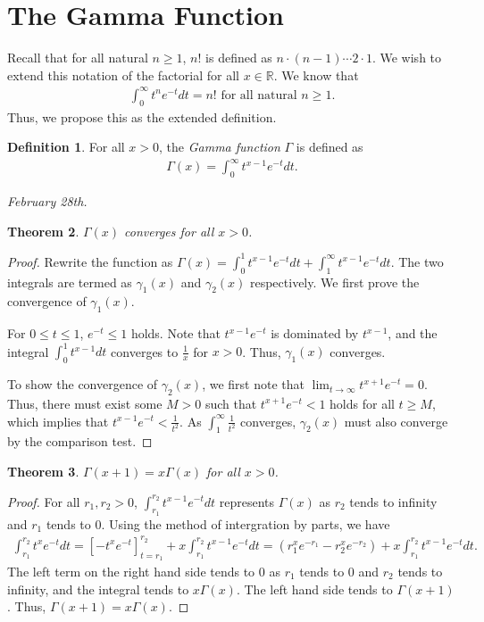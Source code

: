 \documentclass[15pt,a4paper]{book}
\newtheorem{theorem}{Theorem}[chapter]
\theoremstyle{definition}
\newtheorem{definition}[theorem]{Definition}
\newcommand{\eax}[1]{\emph{#1}\index{#1}} %
\newcommand{\R}{\mathbb{R}} %
\begin{document}
\section{The Gamma Function}
Recall that for all natural $n \geq 1$, $n!$ is defined as $n \cdot (n-1) \cdots 2\cdot1$. We wish to extend this notation of the factorial for all $x \in \R$. We know that
\begin{align}
    \int_{0}^{\infty} t^{n} e^{-t} dt = n! \text{ for all natural } n \geq 1.
\end{align}
Thus, we propose this as the extended definition.
\begin{definition}
    For all $x > 0$, the \eax{Gamma function} $\Gamma$ is defined as
    \begin{align}
        \Gamma(x) = \int_{0}^{\infty} t^{x-1}e^{-t} dt.
    \end{align}
\end{definition}


\textit{February 28th.}
\begin{theorem}
    $\Gamma(x)$ converges for all $x > 0$.
\end{theorem}
\begin{proof}
    Rewrite the function as $\Gamma(x) = \int_{0}^{1}t^{x-1}e^{-t}dt + \int_{1}^{\infty} t^{x-1}e^{-t} dt$. The two integrals are termed as $\gamma_{1}(x)$ and $\gamma_{2}(x)$ respectively. We first prove the convergence of $\gamma_{1}(x)$.

    For $0 \leq t \leq 1$, $e^{-t} \leq 1$ holds. Note that $t^{x-1}e^{-t}$ is dominated by $t^{x-1}$, and the integral $\int_{0}^{1} t^{x-1}dt$ converges to $\frac{1}{x}$ for $x > 0$. Thus, $\gamma_{1}(x)$ converges.

    To show the convergence of $\gamma_{2}(x)$, we first note that $\lim_{t \to \infty} t^{x+1}e^{-t} = 0$. Thus, there must exist some $M > 0$ such that $t^{x+1}e^{-t} < 1$ holds for all $t \geq M$, which implies that $t^{x-1}e^{-t} < \frac{1}{t^{2}}$. As $\int_{1}^{\infty} \frac{1}{t^{2}}$ converges, $\gamma_{2}(x)$ must also converge by the comparison test.
\end{proof}

\begin{theorem}
    $\Gamma(x+1) = x \Gamma(x)$ for all $x > 0$.
\end{theorem}
\begin{proof}
    For all $r_{1},r_{2} > 0$, $\int_{r_{1}}^{r_{2}} t^{x-1} e^{-t} dt$ represents $\Gamma(x)$ as $r_{2}$ tends to infinity and $r_{1}$ tends to 0. Using the method of intergration by parts, we have
    \begin{align}
        \int_{r_{1}}^{r_{2}} t^{x} e^{-t} dt = \left[-t^{x}e^{-t}  \right]_{t=r_{1}}^{r_{2}} + x \int_{r_{1}}^{r_{2}} t^{x-1} e^{-t} dt = (r_{1}^{x}e^{-r_{1}}-r_{2}^{x}e^{-r_{2}}) + x\int_{r_{1}}^{r_{2}}t^{x-1}e^{-t}dt.
    \end{align}
    The left term on the right hand side tends to $0$ as $r_{1}$ tends to 0 and $r_{2}$ tends to infinity, and the integral tends to $x\Gamma(x)$. The left hand side tends to $\Gamma(x+1)$. Thus, $\Gamma(x+1) = x\Gamma(x)$.
\end{proof}
\end{document}
